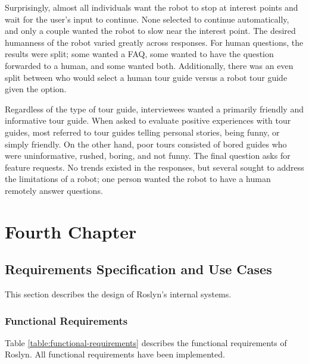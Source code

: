\documentclass[11pt]{report}
\begin{document}
Surprisingly, almost all individuals want the robot to stop at interest points and wait for the user's input to continue. None selected to continue automatically, and only a couple wanted the robot to slow near the interest point. The desired humanness of the robot varied greatly across responses. For human questions, the results were split; some wanted a FAQ, some wanted to have the question forwarded to a human, and some wanted both. Additionally, there was an even split between who would select a human tour guide versus a robot tour guide given the option. 

Regardless of the type of tour guide, interviewees wanted a primarily friendly and informative tour guide. When asked to evaluate positive experiences with tour guides, most referred to tour guides telling personal stories, being funny, or simply friendly. On the other hand, poor tours consisted of bored guides who were uninformative, rushed, boring, and not funny. The final question asks for feature requests. No trends existed in the responses, but several sought to address the limitations of a robot; one person wanted the robot to have a human remotely answer questions.

\chapter{Fourth Chapter}
\label{chap:four}
\section{Requirements Specification and Use Cases}
This section describes the design of Roslyn's internal systems.
\subsection{Functional Requirements}
Table \ref{table:functional-requirements} describes the functional requirements of Roslyn. All functional requirements have been implemented.
\end{document}
